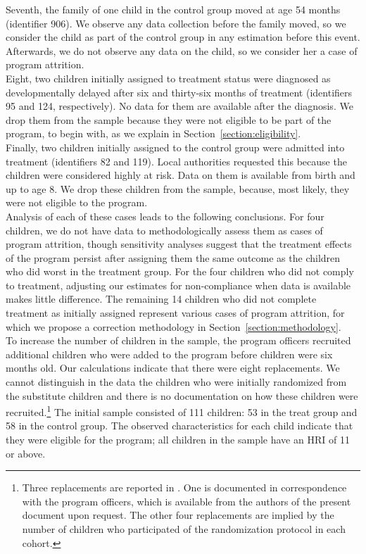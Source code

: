 \noindent Seventh, the family of one child in the control group moved at age 54 months (identifier 906). We observe any data collection before the family moved, so we consider the child as part of the control group in any estimation before this event. Afterwards, we do not observe any data on the child, so we consider her a case of program attrition.\\

\noindent Eight, two children initially assigned to treatment status were diagnosed as developmentally delayed after six and thirty-six months of treatment (identifiers 95 and 124, respectively). No data for them are available after the diagnosis. We drop them from the sample because they were not eligible to be part of the program, to begin with, as we explain in Section~\ref{section:eligibility}.\\

\noindent Finally, two children initially assigned to the control group were admitted into treatment (identifiers 82 and 119). Local authorities requested this because the children were considered highly at risk. Data on them is available from birth and up to age 8. We drop these children from the sample, because, most likely, they were not eligible to the program.\\

\noindent Analysis of each of these cases leads to the following conclusions. For four children, we do not have data to methodologically assess them as cases of program attrition, though sensitivity analyses suggest that the treatment effects of the program persist after assigning them the same outcome as the children who did worst in the treatment group. For the four children who did not comply to treatment, adjusting our estimates for non-compliance when data is available makes little difference. The remaining 14 children who did not complete treatment as initially assigned represent various cases of program attrition, for which we propose a correction methodology in Section~\ref{section:methodology}.\\

\noindent To increase the number of children in the sample, the program officers recruited additional children who were added to the program before children were six months old. Our calculations indicate that there were eight replacements. We cannot distinguish in the data the children who were initially randomized from the substitute children and there is no documentation on how these children were recruited.\footnote{Three replacements are reported in \citet{Ramey_Campbell_1979_SR}. One is documented in correspondence with the program officers, which is available from the authors of the present document upon request. The other four replacements are implied by the number of children who participated of the randomization protocol in each cohort.} The initial sample consisted of 111 children: 53 in the treat group and 58 in the control group. The observed characteristics for each child indicate that they were eligible for the program; all children in the sample have an HRI of 11 or above. \\

